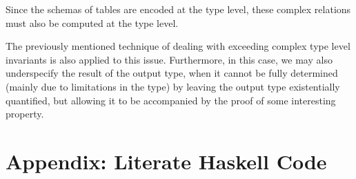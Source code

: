 \begin{description}[leftmargin=1em]
 Since the schemas of tables are encoded at the type level, these complex relations
  must also be computed at the type level.

  The previously mentioned technique of dealing with exceeding complex type level invariants
  is also applied to this issue. Furthermore, in this case, we may also underspecify the 
  result of the output type, when it cannot be fully determined (mainly due to limitations 
  in the type) by leaving the output type existentially quantified, but allowing it to 
  be accompanied by the proof of some interesting property. 

\end{description} 

\chapter*{Appendix: Literate Haskell Code}
